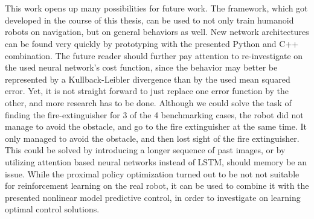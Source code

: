 \\\\
This work opens up many possibilities for future work. The framework, which got developed in the course of this thesis, can be used to not only train humanoid robots on navigation, but on general behaviors as well. New network architectures can be found very quickly by prototyping with the presented Python and C++ combination. The future reader should further pay attention to re-investigate on the used neural network's cost function, since the behavior may better be represented by a Kullback-Leibler divergence than by the used mean squared error. Yet, it is not straight forward to just replace one error function by the other, and more research has to be done. Although we could solve the task of finding the fire-extinguisher for 3 of the 4 benchmarking cases, the robot did not manage to avoid the obstacle, and go to the fire extinguisher at the same time. It only managed to avoid the obstacle, and then lost sight of the fire extinguisher. This could be solved by introducing a longer sequence of past images, or by utilizing attention based neural networks instead of LSTM, should memory be an issue. While the proximal policy optimization turned out to be not not suitable for reinforcement learning on the real robot, it can be used to combine it with the presented nonlinear model predictive control, in order to investigate on learning optimal control solutions.